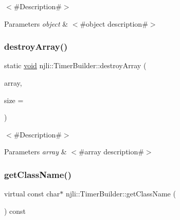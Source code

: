 $<$\#\+Description\#$>$


\begin{DoxyParams}{Parameters}
{\em object} & $<$\#object description\#$>$ \\
\hline
\end{DoxyParams}
\mbox{\label{classnjli_1_1_timer_builder_a51422a93b6453f976ed1aecc64aaf11d}} 
\subsubsection{\texorpdfstring{destroy\+Array()}{destroyArray()}}
{\footnotesize\ttfamily static \mbox{\hyperlink{_thread_8h_af1e856da2e658414cb2456cb6f7ebc66}{void}} njli\+::\+Timer\+Builder\+::destroy\+Array (\begin{DoxyParamCaption}\item[{\mbox{\hyperlink{classnjli_1_1_timer_builder}{Timer\+Builder}} $\ast$$\ast$}]{array,  }\item[{const \mbox{\hyperlink{_util_8h_a10e94b422ef0c20dcdec20d31a1f5049}{u32}}}]{size = {} }\end{DoxyParamCaption})\hspace{0.3cm}{\ttfamily [static]}}

$<$\#\+Description\#$>$


\begin{DoxyParams}{Parameters}
{\em array} & $<$\#array description\#$>$ \\
\hline
\end{DoxyParams}
\mbox{\label{classnjli_1_1_timer_builder_ab904ab539708d20ec75bb79b257220be}} 
\subsubsection{\texorpdfstring{get\+Class\+Name()}{getClassName()}}
{\footnotesize\ttfamily virtual const char$\ast$ njli\+::\+Timer\+Builder\+::get\+Class\+Name (\begin{DoxyParamCaption}{ }\end{DoxyParamCaption}) const\hspace{0.3cm}{\ttfamily [virtual]}}

